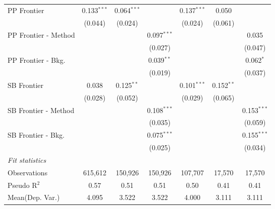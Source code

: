 \begin{tabular}{lcccccc}
   PP Frontier          & 0.133$^{***}$ & 0.064$^{***}$ &               & 0.137$^{***}$ & 0.050        &   \\   
                        & (0.044)       & (0.024)       &               & (0.024)       & (0.061)      &   \\   
   PP Frontier - Method &               &               & 0.097$^{***}$ &               &              & 0.035\\   
                        &               &               & (0.027)       &               &              & (0.047)\\   
   PP Frontier - Bkg.   &               &               & 0.039$^{**}$  &               &              & 0.062$^{*}$\\   
                        &               &               & (0.019)       &               &              & (0.037)\\   
   SB Frontier          & 0.038         & 0.125$^{**}$  &               & 0.101$^{***}$ & 0.152$^{**}$ &   \\   
                        & (0.028)       & (0.052)       &               & (0.029)       & (0.065)      &   \\   
   SB Frontier - Method &               &               & 0.108$^{***}$ &               &              & 0.153$^{***}$\\   
                        &               &               & (0.035)       &               &              & (0.059)\\   
   SB Frontier - Bkg.   &               &               & 0.075$^{***}$ &               &              & 0.155$^{***}$\\   
                        &               &               & (0.025)       &               &              & (0.034)\\   
   \midrule
   \emph{Fit statistics}\\
   Observations         & 615,612       & 150,926       & 150,926       & 107,707       & 17,570       & 17,570\\  
   Pseudo R$^2$         & 0.57          & 0.51          & 0.51          & 0.50          & 0.41         & 0.41\\  
Mean(Dep. Var.) & 4.095 & 3.522 & 3.522 & 4.000 & 3.111 & 3.111 \\
   

\end{tabular}
